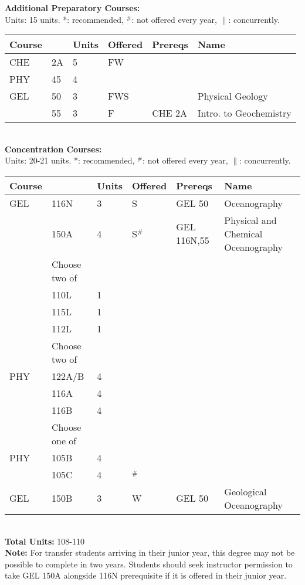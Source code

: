 \documentclass[12pt]{article}
\begin{document}
\newpage
{}
\vskip 0.25cm
\noindent
{\bf Additional Preparatory Courses:  }\\
Units:  15 units. *: recommended, $^\#$: not offered every year, $\parallel$: concurrently.\\
\begin{tabular}{|llllll|}
\hline
Course & & Units & Offered & Prereqs & Name \\
\hline
CHE  & 2A     & 5 & FW  & & \\
PHY  & 45     & 4 &     & & \\
GEL  & 50     & 3 & FWS & & Physical Geology \\
     & 55     & 3 & F      & CHE 2A & Intro. to Geochemistry\\
\hline
\end{tabular}\\
\vskip 0.25cm
\noindent
{\bf Concentration Courses:  }\\
Units:  20-21 units. *: recommended, $^\#$: not offered every year, $\parallel$: concurrently.\\
\begin{tabular}{|llllll|}
\hline
Course & & Units & Offered & Prereqs & Name \\
\hline
GEL  & 116N   & 3 & S      & GEL 50          & Oceanography\\
     & 150A   & 4 & S$^\#$ & GEL 116N,55 & Physical and Chemical Oceanography\\
\hline
    & Choose two of & & & & \\
\hline
    & 110L & 1 & & & \\
    & 115L & 1 & & & \\
    & 112L & 1 & & & \\
\hline
\hline
    & Choose two of & & & & \\
\hline
PHY & 122A/B & 4 & & & \\
    & 116A   & 4 & & & \\
    & 116B   & 4 & & & \\
\hline
\hline
    & Choose one of & & & & \\
\hline
PHY & 105B & 4 & & & \\
    & 105C & 4 & $^\#$ & & \\
GEL & 150B & 3 & W & GEL 50 & Geological Oceanography\\
\hline
\end{tabular}\\
\vskip 0.25cm
\noindent
{\bf Total Units:} 108-110\\
{\bf Note: } For transfer students arriving in their junior year, this
degree may not be possible to complete in two years.  Students should
seek instructor permission to take GEL 150A alongside 116N prerequisite if
it is offered in their junior year.\\
\end{document}
